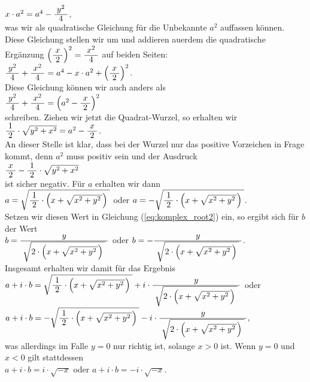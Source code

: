 \\[0.2cm]
\hspace*{1.3cm}
$x \cdot a^2 = a^4 - \bruch{y^2}{4}$,
\\[0.2cm] 
was wir als quadratische Gleichung f\"{u}r die  Unbekannte $a^2$ auffassen k\"{o}nnen.
 Diese Gleichung stellen wir um und addieren au\3erdem die quadratische Erg\"{a}nzung 
$\left(\bruch{x}{2}\right)^2 = \bruch{x^2}{4}$ auf 
beiden Seiten: 
\\[0.2cm]
\hspace*{1.3cm}
$\bruch{y^2}{4} + \bruch{x^2}{4} = a^4 - x \cdot a^2 + \left(\bruch{x}{2}\right)^2$.
\\[0.2cm]
Diese Gleichung k\"{o}nnen wir auch anders als
\\[0.2cm]
\hspace*{1.3cm}
$\bruch{y^2}{4} + \bruch{x^2}{4} = \left(a^2 - \bruch{x}{2}\right)^2$
\\[0.2cm]
schreiben.  Ziehen wir jetzt die Quadrat-Wurzel, so erhalten wir
\\[0.2cm]
\hspace*{1.3cm}
$\bruch{1}{2} \cdot \sqrt{y^2 + x^2} = a^2 - \bruch{x}{2}$.
\\[0.2cm]
An dieser Stelle ist klar, dass bei der Wurzel nur das positive Vorzeichen in Frage kommt, denn
$a^2$ muss positiv sein und der Ausdruck
\\[0.2cm]
\hspace*{1.3cm}
$\bruch{x}{2} - \bruch{1}{2} \cdot \sqrt{y^2 + x^2}$
\\[0.2cm]
ist sicher negativ.  F\"{u}r $a$ erhalten wir dann
\\[0.2cm]
\hspace*{1.3cm}
$a = \sqrt{\bruch{1}{2} \cdot \Bigl(x + \sqrt{x^2 + y^2\,}\Bigr)\;}$ \quad oder \quad 
$a = -\sqrt{\bruch{1}{2} \cdot \Bigl(x + \sqrt{x^2 + y^2\,}\Bigr)\;}$.
\\[0.2cm]
Setzen wir diesen Wert in Gleichung (\ref{eq:komplex_root2}) ein, so ergibt sich f\"{u}r $b$ der Wert
\\[0.2cm]
\hspace*{1.3cm}
$b = \bruch{y}{\sqrt{2\cdot \Bigl(x + \sqrt{x^2 + y^2\,}\Bigr)\;}}$ \quad oder \quad 
$b = -\bruch{y}{\sqrt{2\cdot \Bigl(x + \sqrt{x^2 + y^2\,}\Bigr)\;}}$.
\\[0.2cm]
Insgesamt erhalten wir damit f\"{u}r das Ergebnis 
\\[0.2cm]
\hspace*{1.3cm}
$a + i \cdot b = \sqrt{\bruch{1}{2} \cdot \Bigl(x + \sqrt{x^2 + y^2\,}\Bigr)\;}
                 + i \cdot \bruch{y}{\sqrt{2\cdot \Bigl(x + \sqrt{x^2 + y^2\,}\Bigr)\;}}
$ 
\quad oder \quad
\\[0.2cm]
\hspace*{1.3cm}
$a + i \cdot b = -\sqrt{\bruch{1}{2} \cdot \Bigl(x + \sqrt{x^2 + y^2\,}\Bigr)\;}
                 - i \cdot \bruch{y}{\sqrt{2\cdot \Bigl(x + \sqrt{x^2 + y^2\,}\Bigr)\;}},
$ 
\\[0.2cm]
was allerdings im Falle $y = 0$ nur richtig ist, solange $x > 0$ ist.  Wenn $y = 0$ und $x < 0$ gilt stattdessen
\\[0.2cm]
\hspace*{1.3cm}
$a + i \cdot b = i \cdot \sqrt{-x}$ \quad oder \quad $a + i \cdot b = -i \cdot \sqrt{-x}$.


